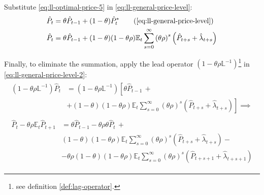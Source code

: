 \documentclass[
	12pt, 
	]{article}
\numberwithin{equation}{section}
\newcommand{\E}[1][t]{{\mathbb{E}_{#1}}}
\theoremstyle{definition}
\theoremstyle{plain}
\theoremstyle{plain}
\theoremstyle{plain}
\begin{document}
Substitute \ref{eq:ll-optimal-price-5} in \ref{eq:ll-general-price-level}:
\begin{align}
	\hat{P}_t &= \theta \hat{P}_{t-1} + (1-\theta) \hat{P}_t^\ast \tag{\ref{eq:ll-general-price-level}}\\
	\hat{P}_t &= \theta \hat{P}_{t-1} + (1-\theta) (1- \theta \rho) \E \sum_{s=0}^{\infty} \left( \theta \rho \right)^s \left( \hat{P}_{t+s} + \hat{\lambda}_{t+s} \right) \label{eq:ll-general-price-level-2}
\end{align}

Finally, to eliminate the summation, apply the lead operator $(1- \theta \rho \mathbb{L}^{-1})$\footnote{see definition \ref{def:lag-operator}.} in \ref{eq:ll-general-price-level-2}:
\begin{align}
	\begin{split}
		(1- \theta \rho \mathbb{L}^{-1}) \hat{P}_t &= (1- \theta \rho \mathbb{L}^{-1}) \left[ \theta \hat{P}_{t-1} \, + \right. \\
		&\left. + (1-\theta) (1- \theta \rho) \E \sum_{s=0}^{\infty} \left( \theta \rho \right)^s \left( \hat{P}_{t+s} + \hat{\lambda}_{t+s} \right) \right] \implies \nonumber
	\end{split} \\
	\begin{split}
		\hat{P}_t - \theta \rho \E \hat{P}_{t+1} &= \theta \hat{P}_{t-1} - \theta \rho \theta \hat{P}_t \, + \\
		& (1-\theta) (1- \theta \rho) \E \sum_{s=0}^{\infty} \left( \theta \rho \right)^s \left( \hat{P}_{t+s} + \hat{\lambda}_{t+s} \right) - \\
		& - \theta \rho (1-\theta) (1- \theta \rho) \E \sum_{s=0}^{\infty} \left( \theta \rho \right)^s \left( \hat{P}_{t+s+1} + \hat{\lambda}_{t+s+1} \right)
	\end{split} \label{eq:ll-general-price-level-3}
\end{align}
\end{document}
